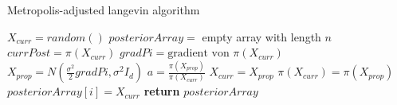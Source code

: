 \begin{algorithm}
    \caption{Metropolis-adjusted langevin algorithm}
    \begin{algorithmic}[1] 
            \State $X_{curr} = random()$ 
            \State $posteriorArray = $ empty array with length $n$
            \State $currPost = \pi(X_{curr})$
                \State $gradPi = \text{gradient von $\pi(X_{curr})$}$
                \State $X_{prop} = N(\frac{\sigma^2}{2} gradPi, \sigma^2I_d)$
                \State $a = \frac{\pi(X_{prop})}{\pi(X_{curr})}$
                    \State $X_{curr} = X_{prop}$
                    \State $\pi(X_{curr}) = \pi(X_{prop})$
                \EndIf
                \State $posteriorArray[i] = X_{curr}$
            \EndFor
            \State \textbf{return} $posteriorArray$
        \EndFunction
    \end{algorithmic}
\end{algorithm}

